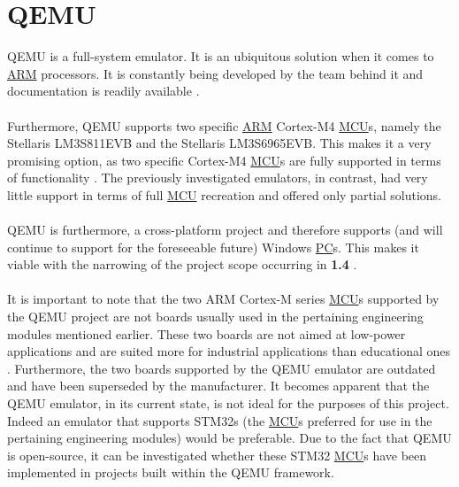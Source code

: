 \section{QEMU}
\label{qemu}
QEMU is a full-system emulator. It is an ubiquitous solution when it comes to \hyperref[listAbr]{ARM} processors. It is constantly being developed by the team behind it and documentation is readily available \cite{QEMU}.
\\\\
Furthermore, QEMU supports two specific \hyperref[listAbr]{ARM} Cortex-M4  \hyperref[listAbr]{MCU}s, namely the Stellaris LM3S811EVB and the Stellaris LM3S6965EVB. This makes it a very promising option, as two specific Cortex-M4 \hyperref[listAbr]{MCU}s are fully supported in terms of functionality \cite{QEMU}\cite{QEMUarm}. The previously investigated emulators, in contrast, had very little support in terms of full \hyperref[listAbr]{MCU} recreation and offered only partial solutions.
\\\\
QEMU is furthermore, a cross-platform project and therefore supports (and will continue to support for the foreseeable future) Windows \hyperref[listAbr]{PC}s. This makes it viable with the narrowing of the project scope occurring in \textbf{1.4 }. 
\\\\
It is important to note that the two ARM Cortex-M series \hyperref[listAbr]{MCU}s supported by the QEMU project are not boards usually used in the pertaining engineering modules mentioned earlier. These two boards are not aimed at low-power applications and are suited more for industrial applications than educational ones \cite{TexasInstruments2014}. Furthermore, the two boards supported by the QEMU emulator are outdated and have been superseded by the manufacturer. It becomes apparent that the QEMU emulator, in its current state, is not ideal for the purposes of this project. Indeed an emulator that supports STM32s (the \hyperref[listAbr]{MCU}s preferred for use in the pertaining engineering modules) would be preferable. Due to the fact that QEMU is open-source, it can be investigated whether these STM32 \hyperref[listAbr]{MCU}s have been implemented in projects built within the QEMU framework.

